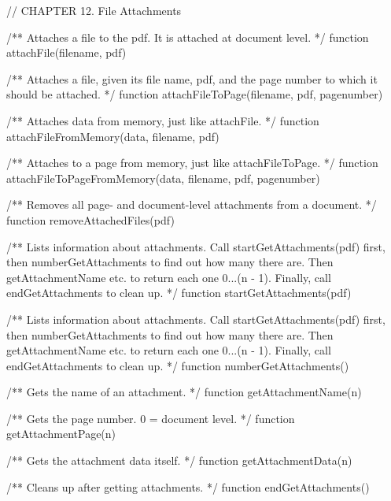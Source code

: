// CHAPTER 12. File Attachments
    
/** Attaches a file to the pdf. It is attached at document level. */
function attachFile(filename, pdf)

/** Attaches a file, given its file name, pdf, and the page number
to which it should be attached. */
function attachFileToPage(filename, pdf, pagenumber)

/** Attaches data from memory, just like attachFile. */
function attachFileFromMemory(data, filename, pdf)

/** Attaches to a page from memory, just like attachFileToPage. */
function attachFileToPageFromMemory(data, filename, pdf, pagenumber)

/** Removes all page- and document-level attachments from a document. */
function removeAttachedFiles(pdf)

/** Lists information about attachments. Call startGetAttachments(pdf) first,
then numberGetAttachments to find out how many there are. Then
getAttachmentName etc. to return each one 0...(n - 1). Finally, call
endGetAttachments to clean up. */
function startGetAttachments(pdf)

/** Lists information about attachments. Call startGetAttachments(pdf) first,
then numberGetAttachments to find out how many there are. Then
getAttachmentName etc. to return each one 0...(n - 1). Finally, call
endGetAttachments to clean up. */
function numberGetAttachments()

/** Gets the name of an attachment. */
function getAttachmentName(n)

/** Gets the page number. 0 = document level. */
function getAttachmentPage(n)

/** Gets the attachment data itself. */
function getAttachmentData(n)

/** Cleans up after getting attachments. */
function endGetAttachments()
